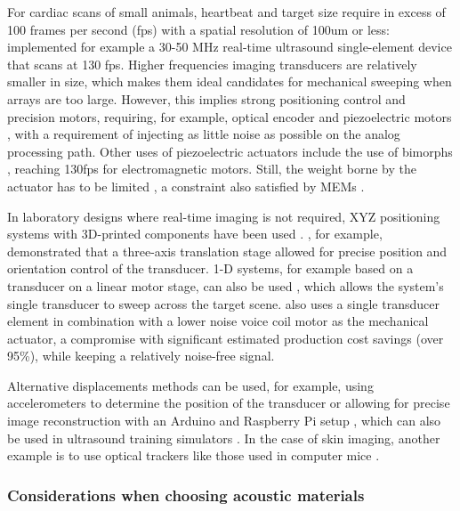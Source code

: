 \documentclass{article}
\begin{document}
For cardiac scans of small animals, heartbeat and target size require in excess of 100 frames per second (fps) with a spatial resolution of 100um or less:  \cite{lei_high-frame_nodate} implemented for example a 30-50 MHz real-time ultrasound single-element device that scans at 130 fps. Higher frequencies imaging transducers are  relatively smaller in size, which makes them ideal candidates for mechanical sweeping when arrays are too large. However, this implies strong positioning control and precision motors, requiring, for example, optical encoder and  piezoelectric motors \cite{carotenuto_very_2004}, with a requirement of injecting as little noise as possible on the analog processing path. Other uses of piezoelectric actuators include the use of bimorphs \cite{bezanson_low-cost_2011}, reaching 130fps for electromagnetic motors. Still, the weight borne by the actuator has to be limited \cite{brown_low_2013, huang_novel_2015}, a constraint also satisfied by MEMs \cite{choi_versatile_2020}.

In laboratory designs where real-time imaging is not required, XYZ positioning systems with 3D-printed components have been used \cite{svilainis_electronics_2014, wang_high_2019, xu_enabling_2019}. \cite{bottenus_feasibility_2016}, for example, demonstrated that a three-axis translation stage allowed for precise position and orientation control of the transducer. 1-D systems, for example based on a transducer on a linear motor stage, can also be used  \cite{qiu_programmable_2011,govindan_reconfigurable_2015, soto-cajiga_fpga-based_2012}, which allows the system's single transducer to sweep across the target scene. \cite{smith_design_2015} also uses a single transducer element in combination with a lower noise voice coil motor as the mechanical actuator, a compromise with significant estimated production cost savings (over 95\%), while keeping a relatively noise-free signal. 

Alternative displacements methods can be used, for example, using accelerometers to determine the position of the transducer  \cite{sobhani_portable_2016} or allowing for precise image reconstruction with an Arduino and Raspberry Pi setup \cite{herickhoff_low-cost_2019}, which can also be used in ultrasound training simulators \cite{farsoni_low-cost_2017}. In the case of skin imaging, another example is to use optical trackers like those used in computer mice \cite{zhang_free-hand_2019, poulsen_optical_2005, herickhoff_low-cost_2018}.


\subsubsection{Considerations when choosing acoustic  materials}
\end{document}
